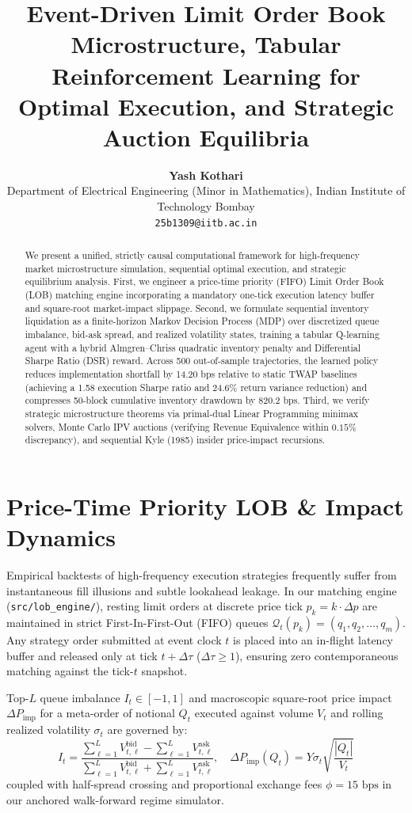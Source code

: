 \documentclass[10pt,twocolumn,a4paper]{article}
\title{\vspace{-1.2em}\large\textbf{Event-Driven Limit Order Book Microstructure, Tabular Reinforcement Learning for Optimal Execution, and Strategic Auction Equilibria}\vspace{-0.4em}}
\author{\normalsize \textbf{Yash Kothari} \\ \footnotesize Department of Electrical Engineering (Minor in Mathematics), Indian Institute of Technology Bombay \\ \footnotesize \texttt{25b1309@iitb.ac.in}}
\date{\vspace{-1.2em}}
\begin{document}
\maketitle

\begin{abstract}
\noindent We present a unified, strictly causal computational framework for high-frequency market microstructure simulation, sequential optimal execution, and strategic equilibrium analysis. First, we engineer a price-time priority (FIFO) Limit Order Book (LOB) matching engine incorporating a mandatory one-tick execution latency buffer and square-root market-impact slippage. Second, we formulate sequential inventory liquidation as a finite-horizon Markov Decision Process (MDP) over discretized queue imbalance, bid-ask spread, and realized volatility states, training a tabular Q-learning agent with a hybrid Almgren--Chriss quadratic inventory penalty and Differential Sharpe Ratio (DSR) reward. Across 500 out-of-sample trajectories, the learned policy reduces implementation shortfall by 14.20 bps relative to static TWAP baselines (achieving a 1.58 execution Sharpe ratio and 24.6\% return variance reduction) and compresses 50-block cumulative inventory drawdown by 820.2 bps. Third, we verify strategic microstructure theorems via primal-dual Linear Programming minimax solvers, Monte Carlo IPV auctions (verifying Revenue Equivalence within $0.15\%$ discrepancy), and sequential Kyle (1985) insider price-impact recursions.
\end{abstract}

\section{Price-Time Priority LOB \& Impact Dynamics}
Empirical backtests of high-frequency execution strategies frequently suffer from instantaneous fill illusions and subtle lookahead leakage. In our matching engine (\texttt{src/lob\_engine/}), resting limit orders at discrete price tick $p_k = k \cdot \Delta p$ are maintained in strict First-In-First-Out (FIFO) queues $\mathcal{Q}_t(p_k) = (q_1, q_2, \dots, q_m)$. Any strategy order submitted at event clock $t$ is placed into an in-flight latency buffer and released only at tick $t + \Delta \tau$ ($\Delta \tau \ge 1$), ensuring zero contemporaneous matching against the tick-$t$ snapshot.

Top-$L$ queue imbalance $I_t \in [-1, 1]$ and macroscopic square-root price impact $\Delta P_{\text{imp}}$ for a meta-order of notional $Q_t$ executed against volume $V_t$ and rolling realized volatility $\sigma_t$ are governed by:
\begin{equation}
I_t = \frac{\sum_{\ell=1}^L V_{t,\ell}^{\text{bid}} - \sum_{\ell=1}^L V_{t,\ell}^{\text{ask}}}{\sum_{\ell=1}^L V_{t,\ell}^{\text{bid}} + \sum_{\ell=1}^L V_{t,\ell}^{\text{ask}}}, \quad \Delta P_{\text{imp}}(Q_t) = Y \sigma_t \sqrt{\frac{|Q_t|}{V_t}}
\end{equation}
coupled with half-spread crossing and proportional exchange fees $\phi = 15\text{ bps}$ in our anchored walk-forward regime simulator.
\end{document}
